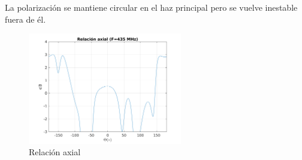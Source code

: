 \documentclass[12pt]{article}
\begin{document}
La polarización se mantiene circular en el haz principal pero se vuelve inestable fuera de él.\\

\begin{figure}[H]
	\centering
	\includegraphics[width=0.6\textwidth]{helix_2_F435_AR.png}
	\caption{Relación axial}
\end{figure}
\end{document}
